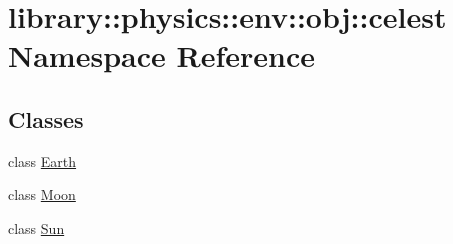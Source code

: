 \hypertarget{namespacelibrary_1_1physics_1_1env_1_1obj_1_1celest}{}\section{library\+:\+:physics\+:\+:env\+:\+:obj\+:\+:celest Namespace Reference}
\label{namespacelibrary_1_1physics_1_1env_1_1obj_1_1celest}
\subsection*{Classes}
\begin{DoxyCompactItemize}
\item 
class \hyperlink{classlibrary_1_1physics_1_1env_1_1obj_1_1celest_1_1_earth}{Earth}
\item 
class \hyperlink{classlibrary_1_1physics_1_1env_1_1obj_1_1celest_1_1_moon}{Moon}
\item 
class \hyperlink{classlibrary_1_1physics_1_1env_1_1obj_1_1celest_1_1_sun}{Sun}
\end{DoxyCompactItemize}
